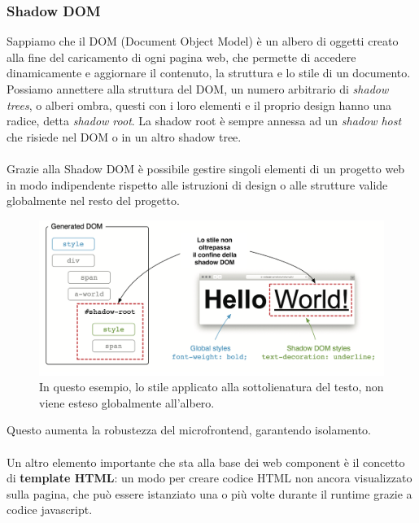 \subsubsection{Shadow DOM}
Sappiamo che il DOM (Document Object Model) è un albero di oggetti creato alla fine del caricamento di ogni pagina web, che 
permette di accedere dinamicamente e aggiornare il contenuto, la struttura e lo stile di un documento.\cite{dom}
\\
Possiamo annettere alla struttura del DOM, un numero arbitrario di \emph{shadow trees}, 
o alberi ombra, questi con i loro elementi e il proprio design hanno una radice, detta  \emph{shadow root}.
La shadow root è sempre annessa ad un \emph{shadow host} che risiede nel DOM o in un altro shadow tree.
\\\\
Grazie alla Shadow DOM è possibile gestire singoli elementi di un progetto web in modo indipendente rispetto 
alle istruzioni di design o alle strutture valide globalmente nel resto del progetto.
\\
\begin{figure}[H]
    \centering
    \includegraphics[width=140mm]{img/shadowdom}
    \caption{In questo esempio, lo stile applicato alla sottolienatura del testo, non viene esteso globalmente all'albero.}
  \end{figure}
Questo aumenta la robustezza del microfrontend, garantendo isolamento.
\\\\
Un altro elemento importante che sta alla base dei web component è il concetto di \textbf{template HTML}: 
un modo per creare codice HTML non ancora visualizzato sulla pagina, che può essere istanziato una o più volte 
durante il runtime grazie a codice javascript.



